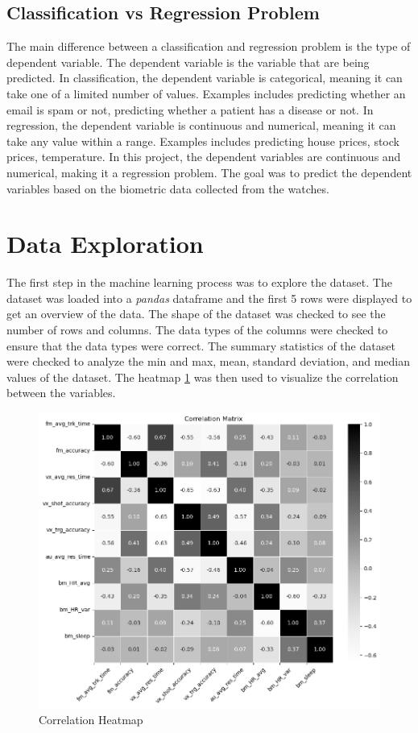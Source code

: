 \subsection*{Classification vs Regression Problem}
The main difference between a classification and regression problem is the type of dependent variable. The dependent variable is the variable that are being predicted. In 
classification, the dependent variable is categorical, meaning it can take one of a limited number of values. Examples includes predicting whether an email is spam or not,
predicting whether a patient has a disease or not. In regression, the dependent variable is continuous and numerical, meaning it can take any value within a range. Examples 
includes predicting house prices, stock prices, temperature. In this project, the dependent variables are continuous and numerical, making it a regression problem. The goal 
was to predict the dependent variables based on the biometric data collected from the watches. 

\section{Data Exploration}
The first step in the machine learning process was to explore the dataset. The dataset was loaded into a \textit{pandas} dataframe and the first 5 rows were displayed to get an overview of the
data. The shape of the dataset was checked to see the number of rows and columns. The data types of the columns were checked to ensure that the data types were correct. The summary
statistics of the dataset were checked to analyze the min and max, mean, standard deviation, and median values of the dataset. The heatmap \ref{fig:correlation_heatmap} was then used to visualize 
the correlation between the variables.

\begin{figure}[H]
    \centering
    \includegraphics[width=1\textwidth]{images/regressionCharts/corr_matrix.png}
    \caption{Correlation Heatmap}
    \label{fig:correlation_heatmap}
\end{figure}

